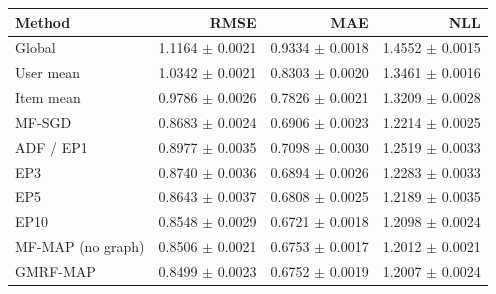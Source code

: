 \begin{tabular}{@{}lrrr@{}}\toprule
Method & RMSE & MAE & NLL\\\midrule
Global & 1.1164 $\pm$ 0.0021 & 0.9334 $\pm$ 0.0018 & 1.4552 $\pm$ 0.0015\\
User mean & 1.0342 $\pm$ 0.0021 & 0.8303 $\pm$ 0.0020 & 1.3461 $\pm$ 0.0016\\
Item mean & 0.9786 $\pm$ 0.0026 & 0.7826 $\pm$ 0.0021 & 1.3209 $\pm$ 0.0028\\
MF-SGD & 0.8683 $\pm$ 0.0024 & 0.6906 $\pm$ 0.0023 & 1.2214 $\pm$ 0.0025\\
ADF / EP1 & 0.8977 $\pm$ 0.0035 & 0.7098 $\pm$ 0.0030 & 1.2519 $\pm$ 0.0033\\
EP3 & 0.8740 $\pm$ 0.0036 & 0.6894 $\pm$ 0.0026 & 1.2283 $\pm$ 0.0033\\
EP5 & 0.8643 $\pm$ 0.0037 & 0.6808 $\pm$ 0.0025 & 1.2189 $\pm$ 0.0035\\
EP10 & 0.8548 $\pm$ 0.0029 & 0.6721 $\pm$ 0.0018 & 1.2098 $\pm$ 0.0024\\
MF-MAP (no graph) & 0.8506 $\pm$ 0.0021 & 0.6753 $\pm$ 0.0017 & 1.2012 $\pm$ 0.0021\\
GMRF-MAP & 0.8499 $\pm$ 0.0023 & 0.6752 $\pm$ 0.0019 & 1.2007 $\pm$ 0.0024\\
\bottomrule\end{tabular}
